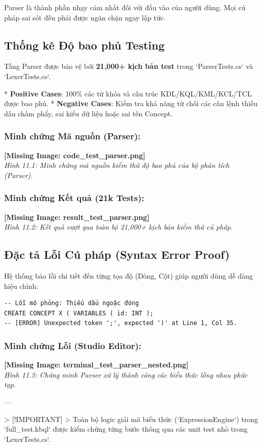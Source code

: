Parser là thành phần nhạy cảm nhất đối với đầu vào của người dùng. Mọi cú pháp sai sót đều phải được ngăn chặn ngay lập tức.

\subsection{Thống kê Độ bao phủ Testing}

Tầng Parser được bảo vệ bởi \textbf{21,000+ kịch bản test} trong `ParserTests.cs` và `LexerTests.cs`.

*   \textbf{Positive Cases}: 100\% các từ khóa và cấu trúc KDL/KQL/KML/KCL/TCL được bao phủ.
*   \textbf{Negative Cases}: Kiểm tra khả năng từ chối các câu lệnh thiếu dấu chấm phẩy, sai kiểu dữ liệu hoặc sai tên Concept.

\subsubsection{Minh chứng Mã nguồn (Parser):}
\textbf{[Missing Image: code_test_parser.png]}\\ \textit{Hình 11.1: Minh chứng mã nguồn kiểm thử độ bao phủ của bộ phân tích (Parser).}

\subsubsection{Minh chứng Kết quả (21k Tests):}
\textbf{[Missing Image: result_test_parser.png]}\\ \textit{Hình 11.2: Kết quả vượt qua toàn bộ 21,000+ kịch bản kiểm thử cú pháp.}

\subsection{Đặc tả Lỗi Cú pháp (Syntax Error Proof)}

Hệ thống báo lỗi chi tiết đến từng tọa độ (Dòng, Cột) giúp người dùng dễ dàng hiệu chỉnh:

\begin{verbatim}
-- Lỗi mô phỏng: Thiếu dấu ngoặc đóng
CREATE CONCEPT X ( VARIABLES ( id: INT );
-- [ERROR] Unexpected token ';', expected ')' at Line 1, Col 35.
\end{verbatim}

\subsubsection{Minh chứng Lỗi (Studio Editor):}
\textbf{[Missing Image: terminal_test_parser_nested.png]}\\ \textit{Hình 11.3: Chứng minh Parser xử lý thành công các biểu thức lồng nhau phức tạp.}

---

> [!IMPORTANT]
> Toàn bộ logic giải mã biểu thức (`ExpressionEngine`) trong `full\_test.kbql` được kiểm chứng từng bước thông qua các unit test nhỏ trong `LexerTests.cs`.

